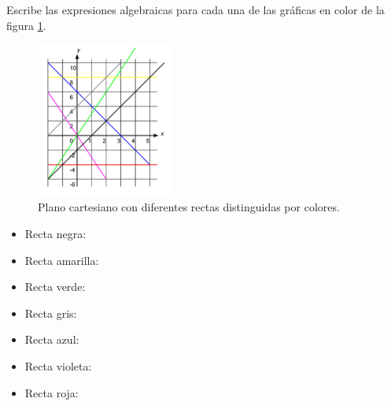 Escribe las expresiones algebraicas para cada una de las gr\'aficas en color de la figura \ref{fig:SINMAT1_U3_AC78_IMG1}.
\begin{figure}[H]
    \centering
    \includegraphics[width=0.4\textwidth]{../images/SINMAT1_U3_AC78_IMG1}
    \caption{Plano cartesiano con diferentes rectas distinguidas por colores.}
    \label{fig:SINMAT1_U3_AC78_IMG1}
\end{figure}

\begin{itemize}
    \item Recta negra: \fillin[$y = 2x - 2$][3cm]
    \item {\color{yellow} Recta amarilla}: \fillin[$y = 8$][3cm]
    \item {\color{green} Recta verde}: \fillin[$y = 3x$][3cm]
    \item {\color{gray} Recta gris}: \fillin[$y = 2x + 4$][3cm]
    \item {\color{blue} Recta azul}: \fillin[$y = -2x + 6$][3cm]
    \item {\color{purple} Recta violeta}: \fillin[$y = -3x $][3cm]
    \item {\color{red} Recta roja}: \fillin[$y = -4$][3cm]
\end{itemize}
